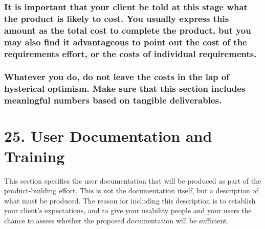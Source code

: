 \documentclass[
]{article}
\begin{document}
\hypertarget{it-is-important-that-your-client-be-told-at-this-stage-what-the-product-is-likely-to-cost.-you-usually-express-this-amount-as-the-total-cost-to-complete-the-product-but-you-may-also-find-it-advantageous-to-point-out-the-cost-of-the-requirements-effort-or-the-costs-of-individual-requirements.}{%
\subsubsection{\texorpdfstring{It is important that your client be told
at this stage what the product is likely to cost. You usually express
this amount as the total cost to complete the product, but you may also
find it advantageous to point out the cost of the requirements effort,
or the costs of individual requirements.
}{It is important that your client be told at this stage what the product is likely to cost. You usually express this amount as the total cost to complete the product, but you may also find it advantageous to point out the cost of the requirements effort, or the costs of individual requirements. }}\label{it-is-important-that-your-client-be-told-at-this-stage-what-the-product-is-likely-to-cost.-you-usually-express-this-amount-as-the-total-cost-to-complete-the-product-but-you-may-also-find-it-advantageous-to-point-out-the-cost-of-the-requirements-effort-or-the-costs-of-individual-requirements.}}

\hypertarget{whatever-you-do-do-not-leave-the-costs-in-the-lap-of-hysterical-optimism.-make-sure-that-this-section-includes-meaningful-numbers-based-on-tangible-deliverables.}{%
\subsubsection{Whatever you do, do not leave the costs in the lap of
hysterical optimism. Make sure that this section includes meaningful
numbers based on tangible
deliverables.}\label{whatever-you-do-do-not-leave-the-costs-in-the-lap-of-hysterical-optimism.-make-sure-that-this-section-includes-meaningful-numbers-based-on-tangible-deliverables.}}

\hypertarget{user-documentation-and-training}{%
\section{25. User Documentation and
Training}\label{user-documentation-and-training}}

This section specifies the user documentation that will be produced as
part of the product-building effort. This is not the documentation
itself, but a description of what must be produced. The reason for
including this description is to establish your client's expectations,
and to give your usability people and your users the chance to assess
whether the proposed documentation will be sufficient.
\end{document}
